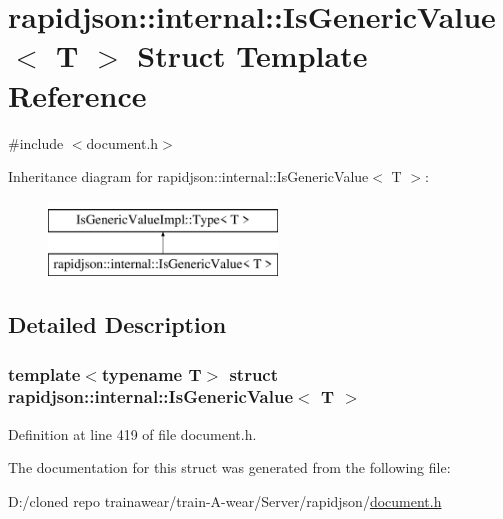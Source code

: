 \hypertarget{structrapidjson_1_1internal_1_1_is_generic_value}{}\section{rapidjson\+::internal\+::Is\+Generic\+Value$<$ T $>$ Struct Template Reference}
\label{structrapidjson_1_1internal_1_1_is_generic_value}


{\ttfamily \#include $<$document.\+h$>$}

Inheritance diagram for rapidjson\+::internal\+::Is\+Generic\+Value$<$ T $>$\+:\begin{figure}[H]
\begin{center}
\leavevmode
\includegraphics[height=2.000000cm]{structrapidjson_1_1internal_1_1_is_generic_value}
\end{center}
\end{figure}


\subsection{Detailed Description}
\subsubsection*{template$<$typename T$>$\newline
struct rapidjson\+::internal\+::\+Is\+Generic\+Value$<$ T $>$}



Definition at line 419 of file document.\+h.



The documentation for this struct was generated from the following file\+:\begin{DoxyCompactItemize}
\item 
D\+:/cloned repo trainawear/train-\/\+A-\/wear/\+Server/rapidjson/\mbox{\hyperlink{document_8h}{document.\+h}}\end{DoxyCompactItemize}
